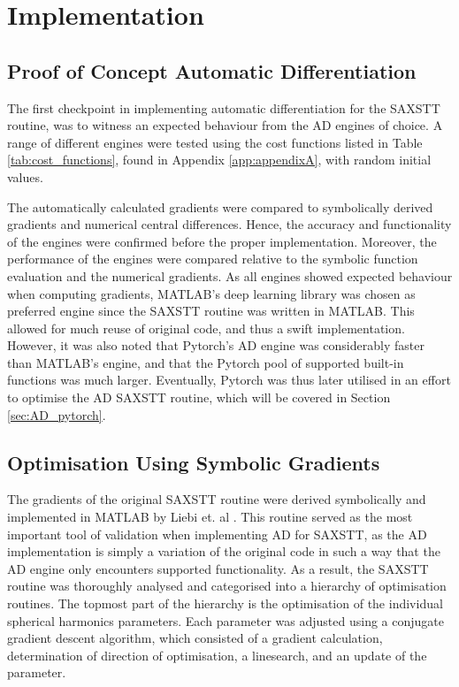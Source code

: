 
\chapter{Implementation}

\section{Proof of Concept Automatic Differentiation}\label{sec:proof_of_concept_AD}

The first checkpoint in implementing automatic differentiation for the SAXSTT routine, was to witness an expected behaviour from the AD engines of choice.
A range of different engines were tested using the cost functions listed in Table \ref{tab:cost_functions}, found in Appendix \ref{app:appendixA}, with random initial values.

The automatically calculated gradients were compared to symbolically derived gradients and numerical central differences.
Hence, the accuracy and functionality of the engines were confirmed before the proper implementation.
Moreover, the performance of the engines were compared relative to the symbolic function evaluation and the numerical gradients.
As all engines showed expected behaviour when computing gradients,
MATLAB's deep learning library was chosen as preferred engine since the SAXSTT routine was written in MATLAB.
This allowed for much reuse of original code, and thus a swift implementation.
However, it was also noted that Pytorch's AD engine was considerably faster than MATLAB's engine, and that the Pytorch pool of supported built-in functions was much larger.
Eventually, Pytorch was thus later utilised in an effort to optimise the AD SAXSTT routine, which will be covered in Section \ref{sec:AD_pytorch}.


\section{Optimisation Using Symbolic Gradients}
The gradients of the original SAXSTT routine were derived symbolically and implemented in MATLAB by Liebi et. al \cite{liebi2015nanostructure}.
This routine served as the most important tool of validation when implementing AD for SAXSTT,
as the AD implementation is simply a variation of the original code in such a way that the AD engine only encounters supported functionality.
As a result, the SAXSTT routine was thoroughly analysed and categorised into a hierarchy of optimisation routines. %
The topmost part of the hierarchy is the optimisation of the individual spherical harmonics parameters.
Each parameter was adjusted using a conjugate gradient descent algorithm,
which consisted of a gradient calculation, determination of direction of optimisation, a linesearch, and an update of the parameter.

